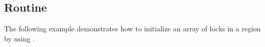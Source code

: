 \subsection{ Routine}
\label{subsec:init_lock}

The following example demonstrates how to initialize an array of locks in a  
region by using .



